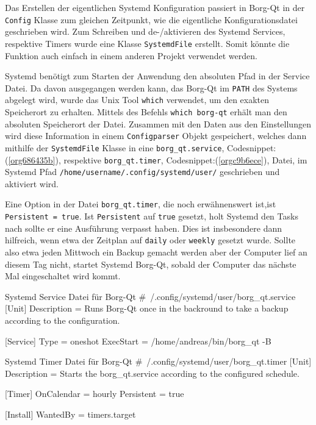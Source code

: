 Das Erstellen der eigentlichen Systemd Konfiguration passiert in Borg-Qt in der
\texttt{Config} Klasse zum gleichen Zeitpunkt, wie die eigentliche Konfigurationsdatei
geschrieben wird. Zum Schreiben und de-/aktivieren des Systemd Services,
respektive Timers wurde eine Klasse \texttt{SystemdFile} erstellt. Somit könnte
die Funktion auch einfach in einem anderen Projekt verwendet werden.

\newpage
Systemd benötigt zum Starten der Anwendung den absoluten Pfad in der Service
Datei. Da davon ausgegangen werden kann, das Borg-Qt im \texttt{PATH} des Systems
abgelegt wird, wurde das Unix Tool \texttt{which} verwendet, um den exakten Speicherort
zu erhalten. Mittels des Befehls \texttt{which borg-qt} erhält man den absoluten
Speicherort der Datei. Zusammen mit den Daten aus den Einstellungen wird diese
Information in einem \texttt{Configparser} Objekt gespeichert, welches dann mithilfe
der \texttt{SystemdFile} Klasse in eine \texttt{borg\_qt.service},
Codesnippet:(\ref{org686435b}), respektive \texttt{borg\_qt.timer},\newline
Codesnippet:(\ref{orgc9b6ece}), Datei, im Systemd Pfad
\texttt{/home/username/.config/systemd/user/} geschrieben und aktiviert wird.

Eine Option in der Datei \texttt{borg\_qt.timer}, die noch erwähnenswert ist,\newline ist
\texttt{Persistent = true}. Ist \texttt{Persistent} auf \texttt{true} gesetzt, holt Systemd den
Tasks nach sollte er eine Ausführung verpasst haben. Dies ist insbesondere dann
hilfreich, wenn etwa der Zeitplan auf \texttt{daily} oder \texttt{weekly} gesetzt wurde.
Sollte also etwa jeden Mittwoch ein Backup gemacht werden aber der Computer
lief an diesem Tag nicht, startet Systemd Borg-Qt, sobald der Computer das
nächste Mal eingeschaltet wird kommt.

\pagebreak
\begin{sexylisting}[label=org686435b]{Systemd Service Datei für Borg-Qt}
#~/.config/systemd/user/borg_qt.service
[Unit]
Description = Runs Borg-Qt once in the backround to take a backup according to the configuration.

[Service]
Type = oneshot
ExecStart = /home/andreas/bin/borg_qt -B
\end{sexylisting}

\begin{sexylisting}[label=orgc9b6ece]{Systemd Timer Datei für Borg-Qt}
#~/.config/systemd/user/borg_qt.timer
[Unit]
Description = Starts the borg_qt.service according to the configured schedule.

[Timer]
OnCalendar = hourly
Persistent = true

[Install]
WantedBy = timers.target
\end{sexylisting}
\newpage

